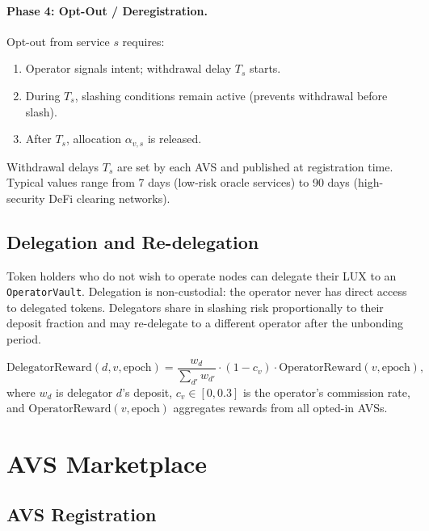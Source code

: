 \documentclass[11pt]{article}
\begin{document}
\paragraph{Phase 4: Opt-Out / Deregistration.}
Opt-out from service $s$ requires:
\begin{enumerate}[leftmargin=1.5em]
  \item Operator signals intent; withdrawal delay $T_s$ starts.
  \item During $T_s$, slashing conditions remain active (prevents withdrawal before slash).
  \item After $T_s$, allocation $\alpha_{v,s}$ is released.
\end{enumerate}

Withdrawal delays $T_s$ are set by each AVS and published at registration time. Typical
values range from 7 days (low-risk oracle services) to 90 days (high-security DeFi
clearing networks).

\subsection{Delegation and Re-delegation}

Token holders who do not wish to operate nodes can delegate their LUX to an
\texttt{OperatorVault}. Delegation is non-custodial: the operator never has direct
access to delegated tokens. Delegators share in slashing risk proportionally to their
deposit fraction and may re-delegate to a different operator after the unbonding period.

\begin{equation}
  \text{DelegatorReward}(d, v, \text{epoch}) =
  \frac{w_d}{\sum_{d'} w_{d'}} \cdot (1 - c_v) \cdot \text{OperatorReward}(v, \text{epoch}),
\end{equation}
where $w_d$ is delegator $d$'s deposit, $c_v \in [0, 0.3]$ is the operator's commission
rate, and $\text{OperatorReward}(v, \text{epoch})$ aggregates rewards from all opted-in AVSs.

\section{AVS Marketplace}
\label{sec:marketplace}

\subsection{AVS Registration}
\end{document}
